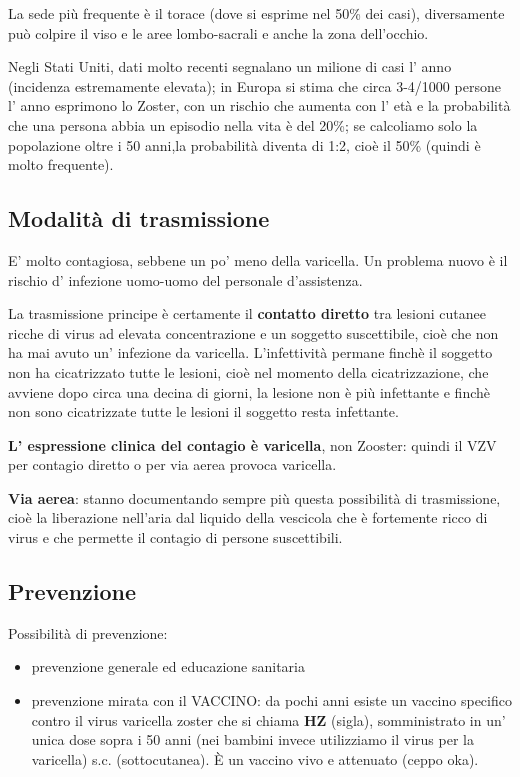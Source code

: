   La sede più frequente è il torace (dove si esprime nel 50\% dei casi),
  diversamente può colpire il viso e le aree lombo-sacrali e anche la
  zona dell'occhio.

  Negli Stati Uniti, dati molto recenti segnalano un milione di casi l'
  anno (incidenza estremamente elevata); in Europa si stima che circa
  3-4/1000 persone l' anno esprimono lo Zoster, con un rischio che
  aumenta con l' età e la probabilità che una persona abbia un episodio
  nella vita è del 20\%; se calcoliamo solo la popolazione oltre i 50
  anni,la probabilità diventa di 1:2, cioè il 50\% (quindi è molto
  frequente).

\subsection{Modalità di trasmissione}

  E' molto contagiosa, sebbene un po' meno della varicella. Un problema
  nuovo è il rischio d' infezione uomo-uomo del personale d'assistenza.

  La trasmissione principe è certamente il \textbf{contatto diretto} tra
  lesioni cutanee ricche di virus ad elevata concentrazione e un
  soggetto suscettibile, cioè che non ha mai avuto un' infezione da
  varicella. L'infettività permane finchè il soggetto non ha
  cicatrizzato tutte le lesioni, cioè nel momento della cicatrizzazione,
  che avviene dopo circa una decina di giorni, la lesione non è più
  infettante e finchè non sono cicatrizzate tutte le lesioni il soggetto
  resta infettante.

  \textbf{L' espressione clinica del contagio è varicella}, non Zooster:
  quindi il VZV per contagio diretto o per via aerea provoca varicella.

  \textbf{Via aerea}: stanno documentando sempre più questa possibilità
  di trasmissione, cioè la liberazione nell'aria dal liquido della
  vescicola che è fortemente ricco di virus e che permette il contagio
  di persone suscettibili.

\subsection{Prevenzione}
  Possibilità di prevenzione:
  \begin{itemize}
  
\item
  prevenzione generale ed educazione sanitaria
\item
  prevenzione mirata con il VACCINO: da pochi anni esiste un vaccino
  specifico contro il virus varicella zoster che si chiama \textbf{HZ}
  (sigla), somministrato in un' unica dose sopra i 50 anni (nei bambini
  invece utilizziamo il virus per la varicella) s.c. (sottocutanea). È
  un vaccino vivo e attenuato (ceppo oka).
  \end{itemize}

